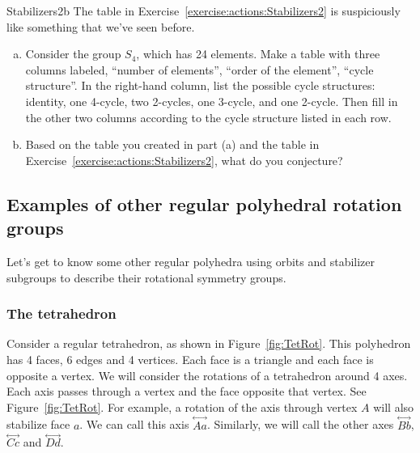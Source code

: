 \begin{exercise}{Stabilizers2b}
The table in Exercise~\ref{exercise:actions:Stabilizers2} is suspiciously like something that we've seen before.
\begin{enumerate}[(a)]
\item
Consider the group $S_4$, which has 24 elements. Make a table with three columns labeled, ``number of elements'', ``order of the element'', ``cycle structure''.  In the right-hand column, list the possible cycle structures: identity, one 4-cycle, two 2-cycles, one 3-cycle, and one 2-cycle. Then fill in the other two columns according to the cycle structure listed in each row.
\item Based on the table you created in part (a) and the table in Exercise~\ref{exercise:actions:Stabilizers2}, what do you conjecture?
\end{enumerate}
\end{exercise}
\subsection{Examples of other regular polyhedral rotation groups}
Let's get to know some other regular polyhedra using orbits and stabilizer subgroups to describe their rotational symmetry groups.
\subsubsection*{The tetrahedron}
Consider a regular tetrahedron, as shown in Figure~\ref{fig:TetRot}. This polyhedron has 4 faces, 6 edges and 4 vertices.  Each face is a triangle and each face is opposite a vertex. We will consider the rotations of a tetrahedron around 4 axes.  Each axis passes through a vertex and the face opposite that vertex. See Figure~\ref{fig:TetRot}. For example, a rotation of the axis through vertex $A$ will also stabilize face $a$.  We can call this axis $\overset{\leftrightarrow}{Aa}$.  Similarly, we will call the other axes $\overset{\leftrightarrow}{Bb}$, $\overset{\leftrightarrow}{Cc}$ and $\overset{\leftrightarrow}{Dd}$.

